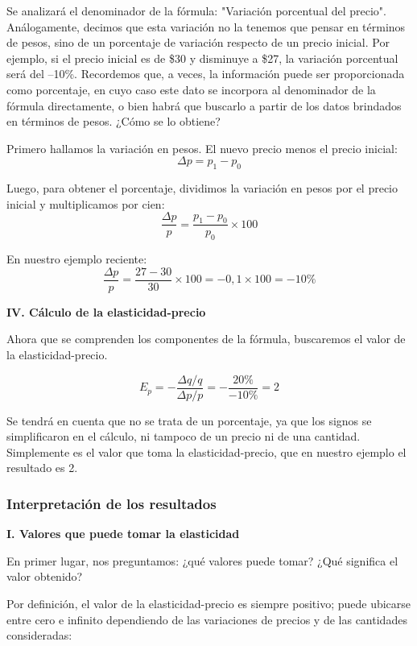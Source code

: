 \documentclass[12pt,a4paper]{article}
\begin{document}
Se analizará el denominador de la fórmula: "Variación porcentual del precio". Análogamente, decimos que esta variación no la tenemos que pensar en términos de pesos, sino de un porcentaje de variación respecto de un precio inicial. Por ejemplo, si el precio inicial es de \$30 y disminuye a \$27, la variación porcentual será del –10\%. Recordemos que, a veces, la información puede ser proporcionada como porcentaje, en cuyo caso este dato se incorpora al denominador de la fórmula directamente, o bien habrá que buscarlo a partir de los datos brindados en términos de pesos. ¿Cómo se lo obtiene?

Primero hallamos la variación en pesos. El nuevo precio menos el precio inicial:
\[
\Delta p = p_1 - p_0
\]

Luego, para obtener el porcentaje, dividimos la variación en pesos por el precio inicial y multiplicamos por cien:
\[
\frac{\Delta p}{p} = \frac{p_1 - p_0}{p_0} \times 100
\]

En nuestro ejemplo reciente:
\[
\frac{\Delta p}{p} = \frac{27 - 30}{30} \times 100 = -0,1 \times 100 = -10\%
\]

\textbf{IV. Cálculo de la elasticidad-precio}

Ahora que se comprenden los componentes de la fórmula, buscaremos el valor de la elasticidad-precio.

\[
E_p = -\frac{\Delta q / q}{\Delta p / p} = -\frac{20\%}{-10\%} = 2
\]

Se tendrá en cuenta que no se trata de un porcentaje, ya que los signos se simplificaron en el cálculo, ni tampoco de un precio ni de una cantidad. Simplemente es el valor que toma la elasticidad-precio, que en nuestro ejemplo el resultado es 2.

\subsubsection{Interpretación de los resultados}

\textbf{I. Valores que puede tomar la elasticidad}

En primer lugar, nos preguntamos: ¿qué valores puede tomar? ¿Qué significa el valor obtenido?

Por definición, el valor de la elasticidad-precio es siempre positivo; puede ubicarse entre cero e infinito dependiendo de las variaciones de precios y de las cantidades consideradas:
\end{document}
